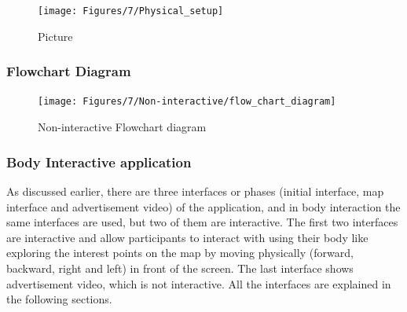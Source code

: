 \begin{figure}[H]
    \centering
    \texttt{[image: Figures/7/Physical\_setup]}
    \caption{Picture}%
    \label{fig:hardwaresetup}%
\end{figure}



\subsubsection{Flowchart Diagram}

\begin{figure}[H]
    \centering
    \texttt{[image: Figures/7/Non-interactive/flow\_chart\_diagram]}
    \caption{Non-interactive Flowchart diagram}%
    \label{fig:non_inter_flowchart}%
\end{figure}
\fi


\subsubsection{Body Interactive application}
As discussed earlier, there are three interfaces or phases (initial interface, map interface and advertisement video) of the application, and in body interaction the same interfaces are used, but two of them are interactive. The first two interfaces are interactive and allow participants to interact with using their body like exploring the interest points on the map by moving physically (forward, backward, right and left) in front of the screen. The last interface shows advertisement video, which is not interactive.  All the interfaces are explained in the following sections.

